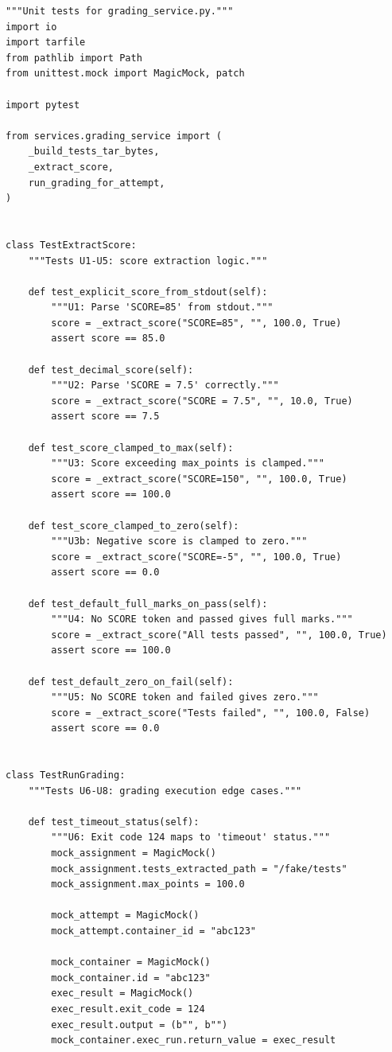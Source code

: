 \documentclass[12pt, letterpaper]{article}
\begin{document}
\begin{lstlisting}[style=pythonstyle]
"""Unit tests for grading_service.py."""
import io
import tarfile
from pathlib import Path
from unittest.mock import MagicMock, patch

import pytest

from services.grading_service import (
    _build_tests_tar_bytes,
    _extract_score,
    run_grading_for_attempt,
)


class TestExtractScore:
    """Tests U1-U5: score extraction logic."""

    def test_explicit_score_from_stdout(self):
        """U1: Parse 'SCORE=85' from stdout."""
        score = _extract_score("SCORE=85", "", 100.0, True)
        assert score == 85.0

    def test_decimal_score(self):
        """U2: Parse 'SCORE = 7.5' correctly."""
        score = _extract_score("SCORE = 7.5", "", 10.0, True)
        assert score == 7.5

    def test_score_clamped_to_max(self):
        """U3: Score exceeding max_points is clamped."""
        score = _extract_score("SCORE=150", "", 100.0, True)
        assert score == 100.0

    def test_score_clamped_to_zero(self):
        """U3b: Negative score is clamped to zero."""
        score = _extract_score("SCORE=-5", "", 100.0, True)
        assert score == 0.0

    def test_default_full_marks_on_pass(self):
        """U4: No SCORE token and passed gives full marks."""
        score = _extract_score("All tests passed", "", 100.0, True)
        assert score == 100.0

    def test_default_zero_on_fail(self):
        """U5: No SCORE token and failed gives zero."""
        score = _extract_score("Tests failed", "", 100.0, False)
        assert score == 0.0


class TestRunGrading:
    """Tests U6-U8: grading execution edge cases."""

    def test_timeout_status(self):
        """U6: Exit code 124 maps to 'timeout' status."""
        mock_assignment = MagicMock()
        mock_assignment.tests_extracted_path = "/fake/tests"
        mock_assignment.max_points = 100.0

        mock_attempt = MagicMock()
        mock_attempt.container_id = "abc123"

        mock_container = MagicMock()
        mock_container.id = "abc123"
        exec_result = MagicMock()
        exec_result.exit_code = 124
        exec_result.output = (b"", b"")
        mock_container.exec_run.return_value = exec_result


\end{lstlisting}
\end{document}
